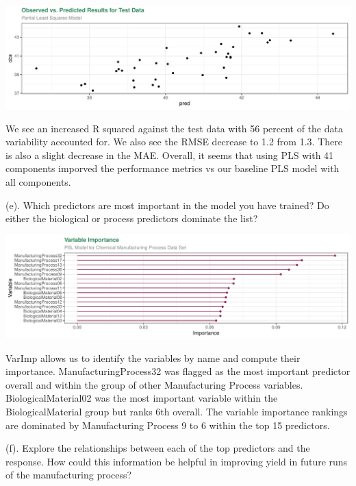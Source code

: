 \documentclass[]{report}
\begin{document}
\includegraphics{Homework-Two_files/figure-latex/kj-6.3d-1.pdf}

We see an increased R squared against the test data with 56 percent of
the data variability accounted for. We also see the RMSE decrease to 1.2
from 1.3. There is also a slight decrease in the MAE. Overall, it seems
that using PLS with 41 components imporved the performance metrics vs
our baseline PLS model with all components.

\begin{subquestion}{(e).} Which predictors are most important in the model you have trained? Do either the biological or process predictors dominate the list? 
\end{subquestion}

\includegraphics{Homework-Two_files/figure-latex/kj-6.3e-1.pdf}

VarImp allows us to identify the variables by name and compute their
importance. ManufacturingProcess32 was flagged as the most important
predictor overall and within the group of other Manufacturing Process
variables. BiologicalMaterial02 was the most important variable within
the BiologicalMaterial group but ranks 6th overall. The variable
importance rankings are dominated by Manufacturing Process 9 to 6 within
the top 15 predictors.

\begin{subquestion}{(f).} Explore the relationships between each of the top predictors and the response. How could this information be helpful in improving yield in future runs of the manufacturing process?
\end{subquestion}
\end{document}
